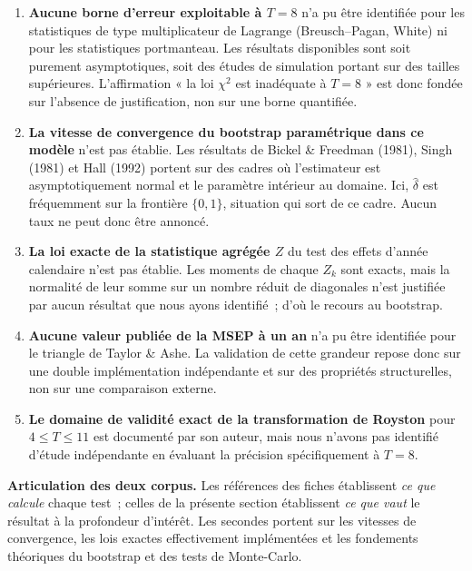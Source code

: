 \documentclass[a4paper,11pt]{article}
\begin{document}
\begin{enumerate}[itemsep=3pt]
  \item \textbf{Aucune borne d'erreur exploitable à $T = 8$} n'a pu être
  identifiée pour les statistiques de type multiplicateur de Lagrange
  (Breusch--Pagan, White) ni pour les statistiques portmanteau. Les résultats
  disponibles sont soit purement asymptotiques, soit des études de simulation
  portant sur des tailles supérieures. L'affirmation « la loi $\chi^2$ est
  inadéquate à $T = 8$ » est donc fondée sur l'absence de justification, non sur
  une borne quantifiée.
  \item \textbf{La vitesse de convergence du bootstrap paramétrique dans ce
  modèle} n'est pas établie. Les résultats de Bickel \& Freedman (1981), Singh
  (1981) et Hall (1992) portent sur des cadres où l'estimateur est
  asymptotiquement normal et le paramètre intérieur au domaine. Ici,
  $\hat\delta$ est fréquemment sur la frontière $\{0,1\}$, situation qui sort de
  ce cadre. Aucun taux ne peut donc être annoncé.
  \item \textbf{La loi exacte de la statistique agrégée $Z$} du test des effets
  d'année calendaire n'est pas établie. Les moments de chaque $Z_k$ sont exacts,
  mais la normalité de leur somme sur un nombre réduit de diagonales n'est
  justifiée par aucun résultat que nous ayons identifié~; d'où le recours au
  bootstrap.
  \item \textbf{Aucune valeur publiée de la MSEP à un an} n'a pu être identifiée
  pour le triangle de Taylor \& Ashe. La validation de cette grandeur repose donc
  sur une double implémentation indépendante et sur des propriétés structurelles,
  non sur une comparaison externe.
  \item \textbf{Le domaine de validité exact de la transformation de Royston}
  pour $4 \le T \le 11$ est documenté par son auteur, mais nous n'avons pas
  identifié d'étude indépendante en évaluant la précision spécifiquement à
  $T = 8$.
\end{enumerate}

\medskip
\begin{encadre}
\textbf{Articulation des deux corpus.} Les références des fiches établissent
\emph{ce que calcule} chaque test~; celles de la présente section établissent
\emph{ce que vaut} le résultat à la profondeur d'intérêt. Les secondes portent
sur les vitesses de convergence, les lois exactes effectivement implémentées et
les fondements théoriques du bootstrap et des tests de Monte-Carlo.
\end{encadre}
\end{document}
